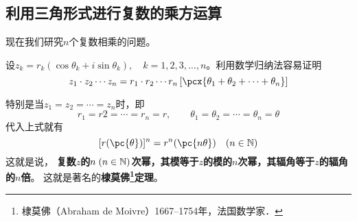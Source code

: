 \subsection{利用三角形式进行复数的乘方运算}

现在我们研究$n$个复数相乘的问题。

设$z_k=r_k(\cos\theta_k+i\sin\theta_k),\quad k=1,2,3,\ldots,n$。利用数学归纳法容易证明
\[z_1\cdot z_2\cdots z_n=r_1\cdot r_2\cdots r_n\left[\pcx{\theta_1+\theta_2+\cdots+\theta_n}\right]\]

特别是当$z_1= z_2=\cdots= z_n$时，即
\[r_1=r2=\cdots=r_n=r,\qquad \theta_1=\theta_2=\cdots=\theta_n=\theta\]
代入上式就有
\[[r(\pc{\theta})]^n=r^n(\pc{n\theta})\quad (n\in\N)\]
这就是说，
\textbf{复数$z$的$n\; (n\in\mathbb{N})$次幂，其模等于$z$的模的$n$次幂，其辐角等于$z$的辐角的$n$倍}。
这就是著名的\textbf{棣莫佛\footnote{棣莫佛（Abraham de Moivre）1667--1754年，法国数学家．}定理}。







\begin{example}
    
\end{example}

\begin{solution}
    
\end{solution}


\begin{example}
    
\end{example}

\begin{solution}
    
\end{solution}



\begin{example}
    
\end{example}

\begin{solution}
    
\end{solution}


\begin{example}
    
\end{example}

\begin{solution}
    
\end{solution}



\begin{example}
    
\end{example}

\begin{solution}
    
\end{solution}



\begin{example}
    
\end{example}

\begin{solution}
    
\end{solution}